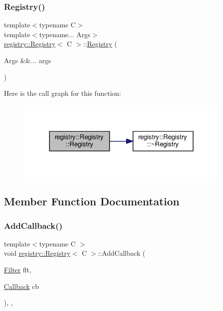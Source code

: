 \subsubsection{\texorpdfstring{Registry()}{Registry()}\hspace{0.1cm}{\footnotesize\ttfamily [5/5]}}
{\footnotesize\ttfamily template$<$typename C$>$ \\
template$<$typename... Args$>$ \\
\hyperlink{classregistry_1_1Registry}{registry\+::\+Registry}$<$ C $>$\+::\hyperlink{classregistry_1_1Registry}{Registry} (\begin{DoxyParamCaption}\item[{Args \&\&...}]{args }\end{DoxyParamCaption})\hspace{0.3cm}{\ttfamily [noexcept]}}

Here is the call graph for this function\+:\nopagebreak
\begin{figure}[H]
\begin{center}
\leavevmode
\includegraphics[width=300pt]{classregistry_1_1Registry_a8e577f4054494ec562dcb84f99a613b0_cgraph}
\end{center}
\end{figure}


\subsection{Member Function Documentation}
\mbox{\label{classregistry_1_1Registry_aa59df03bcaccf9a9687dbedc4e36cf33}} 
\subsubsection{\texorpdfstring{Add\+Callback()}{AddCallback()}}
{\footnotesize\ttfamily template$<$typename C $>$ \\
void \hyperlink{classregistry_1_1Registry}{registry\+::\+Registry}$<$ C $>$\+::Add\+Callback (\begin{DoxyParamCaption}\item[{\hyperlink{classregistry_1_1Filter}{Filter}}]{flt,  }\item[{\hyperlink{classregistry_1_1AbstractRegistry_a08a798ca9ca1c4c983ebd2386ca3c315}{Callback}}]{cb }\end{DoxyParamCaption})\hspace{0.3cm}{\ttfamily [override]}, {\ttfamily [virtual]}, {\ttfamily [noexcept]}}




